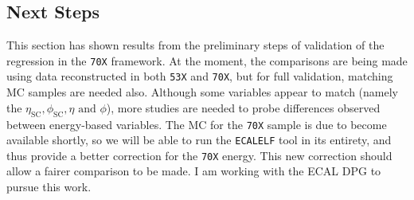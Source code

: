 \documentclass[10pt]{article}
\begin{document}
\subsection{Next Steps}

This section has shown results from the preliminary steps of validation of the regression in the \texttt{70X} framework. At the moment, the comparisons are being made using data reconstructed in both \texttt{53X} and \texttt{70X}, but for full validation, matching MC samples are needed also. Although some variables appear to match (namely the $\eta_{\text{SC}},\phi_{\text{SC}},\eta \text{ and }\phi$), more studies are needed to probe differences observed between energy-based variables. The MC for the \texttt{70X} sample is due to become available shortly, so we will be able to run the \texttt{ECALELF} tool in its entirety, and thus provide a better correction for the \texttt{70X} energy. This new correction should allow a fairer comparison to be made. I am working with the ECAL DPG to pursue this work.
\end{document}
